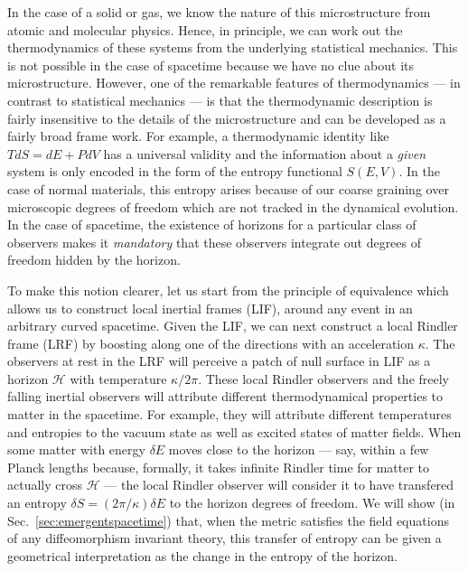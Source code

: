 \documentclass[12pt]{iopart}
\begin{document}
In the case of a solid or gas, we know the nature of this microstructure from atomic and molecular physics. Hence, in principle, we can work out the thermodynamics of these systems from the underlying statistical mechanics. This is not possible in the case of spacetime because we have no clue about its microstructure. However, one of the remarkable features of thermodynamics
--- in contrast to statistical mechanics ---
is that the thermodynamic description is fairly insensitive to the details of the microstructure and can be developed as a fairly broad frame work. For example, a thermodynamic identity like $TdS = dE+PdV$ has a universal validity and the information about a \textit{given} system is only encoded in the form of the entropy functional $S(E,V)$. In the case of normal materials, this
entropy arises because of our coarse graining over microscopic degrees of freedom which are not tracked in the dynamical evolution. In the case of spacetime, the existence of horizons for a particular class of observers makes it \textit{mandatory} that these observers  integrate out degrees of freedom hidden by the horizon. 

To make this notion clearer, let us start from the principle of equivalence which allows us to construct local inertial frames (LIF), around any event in an arbitrary curved spacetime.
  Given the LIF, we can next construct a local Rindler frame (LRF)
  by  boosting along one of the directions  with an acceleration $\kappa$.
The observers at rest  in the LRF will perceive  a patch of null surface in LIF as  a horizon $\mathcal{H}$ with temperature $\kappa/2\pi$.
 These local Rindler observers and the freely falling inertial observers will attribute
   different thermodynamical properties to matter in the spacetime. For example, they will attribute different temperatures and entropies to the vacuum state
   as well as excited states of matter fields.
  When some matter with energy $\delta E$ moves close to the horizon --- say, within a few Planck lengths because,  formally, it takes infinite Rindler time for matter to actually cross $\mathcal{H}$ --- the local Rindler observer will consider it to have  transfered an entropy  $\delta S = (2\pi/\kappa) \delta E$ 
   to the horizon degrees of freedom. We will  show (in Sec.~\ref{sec:emergentspacetime}) that, when the metric satisfies the field equations of any diffeomorphism invariant theory, this transfer of entropy can be given  
   \cite{tp09papers}
   a  geometrical interpretation as the change in the  entropy of the horizon.
\end{document}
